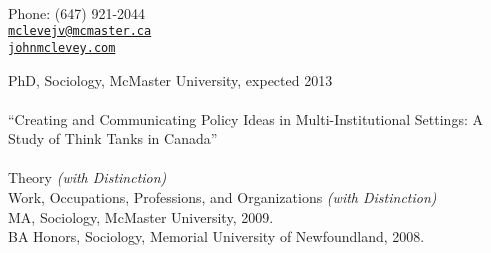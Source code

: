 \documentclass[11pt,usenames,dvipsnames]{article}
\makeatletter
\def\myemail{mclevejv@mcmaster.ca}
\def\myphone{(647) 921-2044}
\def\lastupdated{Last Updated: October 12, 2012} %
\makeatother
\begin{document}
\begin{minipage}[t]{2.95in}
 \\
  
\end{minipage}
\hfill     
\hfill
\begin{minipage}[t]{1.7in}
  \flushright \footnotesize Phone: \myphone \\ 
  {\scriptsize  \texttt{\href{mailto:\myemail}{\myemail}}} \\
  {\scriptsize  \texttt{\href{http://www.johnmclevey.com}{johnmclevey.com}}}\\
\end{minipage}


\bigskip

\reversemarginpar

\medskip 

\medskip 
{}

\noindent PhD, Sociology, McMaster University, expected 2013\\ 

\\ 
``Creating and Communicating Policy Ideas in Multi-Institutional Settings: A Study of Think Tanks in Canada''\\

\\
Theory {\it (with Distinction)}\\
Work, Occupations, Professions, and Organizations {\it (with Distinction)}\\

\noindent MA, Sociology, McMaster University, 2009.\\
\noindent BA Honors, Sociology, Memorial University of Newfoundland, 2008.\\
\end{document}
